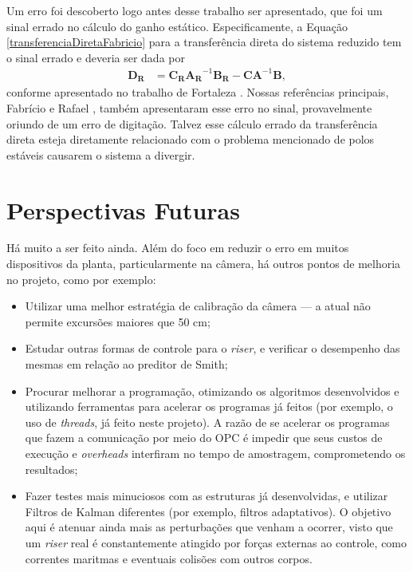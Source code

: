 Um erro foi descoberto logo antes desse trabalho ser apresentado, que foi um sinal errado no cálculo do ganho estático. Especificamente, a Equação \ref{transferenciaDiretaFabricio} para a transferência direta do sistema reduzido tem o sinal errado e deveria ser dada por \begin{align}
	\mathbf{D_R} &= \mathbf{C_R}\mathbf{A_R}^{-1}\mathbf{B_R} - \mathbf{C}\mathbf{A}^{-1}\mathbf{B},
\end{align} conforme apresentado no trabalho de Fortaleza \cite{teseEugenio}. Nossas referências principais, Fabrício \cite{fabricioIFAC} e Rafael \cite{rafaelMestrado}, também apresentaram esse erro no sinal, provavelmente oriundo de um erro de digitação. Talvez esse cálculo errado da transferência direta esteja diretamente relacionado com o problema mencionado de polos estáveis causarem o sistema a divergir.

\section{Perspectivas Futuras}
Há muito a ser feito ainda. Além do foco em reduzir o erro em muitos dispositivos da planta, particularmente na câmera, há outros pontos de melhoria no projeto, como por exemplo:
\begin{itemize}
\item Utilizar uma melhor estratégia de calibração da câmera --- a atual não permite excursões maiores que 50 cm;
\item Estudar outras formas de controle para o \textit{riser}, e verificar o desempenho das mesmas em relação ao preditor de Smith;
\item Procurar melhorar a programação, otimizando os algoritmos desenvolvidos e utilizando ferramentas para acelerar os programas já feitos (por exemplo, o uso de \textit{threads}, já feito neste projeto). A razão de se acelerar os programas que fazem a comunicação por meio do OPC é impedir que seus custos de execução e \textit{overheads} interfiram no tempo de amostragem, comprometendo os resultados;
\item Fazer testes mais minuciosos com as estruturas já desenvolvidas, e utilizar Filtros de Kalman diferentes (por exemplo, filtros adaptativos). O objetivo aqui é atenuar ainda mais as perturbações que venham a ocorrer, visto que um \textit{riser} real é constantemente atingido por forças externas ao controle, como correntes maritmas e eventuais colisões com outros corpos.
\end{itemize}